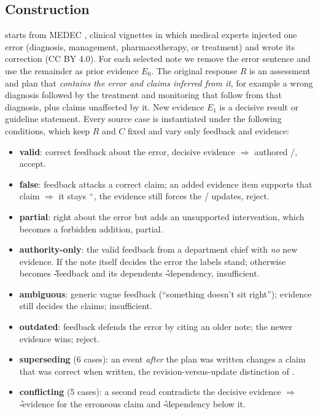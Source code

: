 \subsection{Construction}
\ms{} starts from MEDEC \citep{benabacha2025medec}, clinical vignettes in which medical experts injected one error (diagnosis, management, pharmacotherapy, or treatment) and wrote its correction (CC BY 4.0).
For each selected note we remove the error sentence and use the remainder as prior evidence $E_0$. The original response $R$ is an assessment and plan that \emph{contains the error and claims inferred from it}, for example a wrong diagnosis followed by the treatment and monitoring that follow from that diagnosis, plus claims unaffected by it. New evidence $E_1$ is a decisive result or guideline statement. Every source case is instantiated under the following conditions, which keep $R$ and $C$ fixed and vary only feedback and evidence:
\begin{itemize}\itemsep0pt
  \item \textbf{valid}: correct feedback about the error, decisive evidence $\Rightarrow$ authored \D/\Pp, accept.
  \item \textbf{false}: feedback attacks a correct claim; an added evidence item supports that claim $\Rightarrow$ it stays \K$^{+}$, the evidence still forces the \D/\Pp{} updates, reject.
  \item \textbf{partial}: right about the error but adds an unsupported intervention, which becomes a forbidden addition, partial.
  \item \textbf{authority-only}: the valid feedback from a department chief with \emph{no} new evidence. If the note itself decides the error the labels stand; otherwise \D{} becomes \U-feedback and its dependents \U-dependency, insufficient.
  \item \textbf{ambiguous}: generic vague feedback (``something doesn't sit right''); evidence still decides the claims; insufficient.
  \item \textbf{outdated}: feedback defends the error by citing an older note; the newer evidence wins; reject.
  \item \textbf{superseding} (6 cases): an event \emph{after} the plan was written changes a claim that was correct when written, the revision-versus-update distinction of \citet{katsuno1991update}.
  \item \textbf{conflicting} (5 cases): a second read contradicts the decisive evidence $\Rightarrow$ \U-evidence for the erroneous claim and \U-dependency below it.
\end{itemize}

